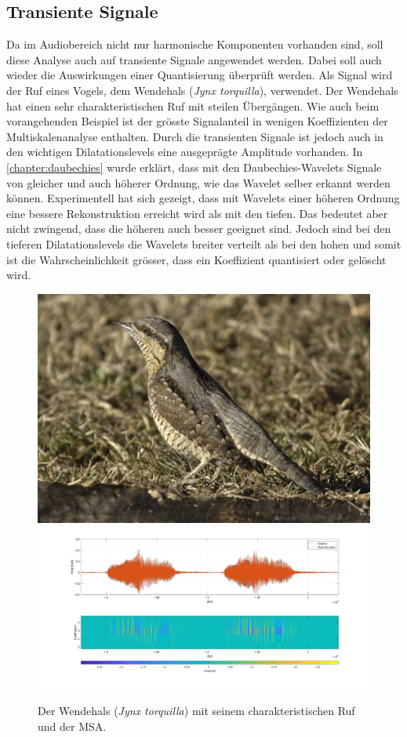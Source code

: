\begin{refsection}
\subsection{Transiente Signale}
%
Da im Audiobereich nicht nur harmonische Komponenten vorhanden sind, soll diese Analyse auch auf transiente Signale angewendet werden.
Dabei soll auch wieder die Auswirkungen einer Quantisierung überprüft werden.
Als Signal wird der Ruf eines Vogels, dem Wendehals ({\em Jynx torquilla}), verwendet.
%
%
Der Wendehals hat einen sehr charakteristischen Ruf mit steilen Übergängen.
Wie auch beim vorangehenden Beispiel ist der grösste Signalanteil in wenigen Koeffizienten der Multiskalenanalyse enthalten.
Durch die transienten Signale ist jedoch auch in den wichtigen Dilatationslevels eine ausgeprägte Amplitude vorhanden.
In \autoref{chapter:daubechies} wurde erklärt, dass mit den Daubechies-Wavelets Signale von gleicher und auch höherer Ordnung, wie das Wavelet selber erkannt werden können. 
Experimentell hat sich gezeigt, dass mit Wavelets einer höheren Ordnung eine bessere Rekonstruktion erreicht wird als mit den tiefen.
Das bedeutet aber nicht zwingend, dass die höheren auch besser geeignet sind.
Jedoch sind bei den tieferen Dilatationslevels die Wavelets breiter verteilt als bei den hohen und somit ist die Wahrscheinlichkeit grösser, dass ein Koeffizient quantisiert oder gelöscht wird. 
\begin{figure}
\includegraphics[width=0.4\linewidth]{papers/compress/Bilder/wendehals.jpg}
\includegraphics[width=0.6\linewidth]{papers/compress/Bilder/jynxAll.pdf}
\caption{Der Wendehals (\textit{Jynx torquilla}) \cite{wikipedia:wendehals} mit seinem charakteristischen Ruf und der MSA.}

\end{figure}
\end{refsection}

